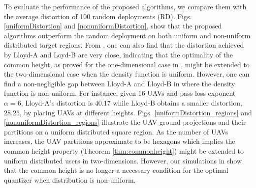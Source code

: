 \documentclass[smallabstract,smallcaptions]{dccpaper}
\begin{document}
To evaluate the performance of the proposed algorithms, we compare them with the average distortion of 100 random
deployments (RD).  Figs. \ref{uniformDistortion} and \ref{nonuniformDistortion}, show that the proposed algorithms
outperform the random deployment on both uniform and non-uniform distributed target regions.  From
, one can also find that the distortion achieved by Lloyd-A and Loyd-B are very close,
indicating that the optimality of the common height, as proved for the one-dimensional case in ,
might be extended to the two-dimensional case when the density function is uniform.  However, one can find a non-negligible
gap between Lloyd-A and Lloyd-B in  where the density function is non-uniform. For
instance, given $16$ UAVs and pass loss exponent $\alpha=6$, Lloyd-A's distortion is $40.17$ while Lloyd-B obtains a smaller
distortion, $28.25$, by placing UAVs at different heights.  
%
Figs. \ref{uniformDistortion_regions} and
\ref{nonuniformDistortion_regions} illustrate the UAV ground projections and their partitions on a uniform distributed
square region. As the number of UAVs increases, the UAV partitions approximate to be hexagons which implies the common height
property (Theorem \ref{thm:commonheight}) might be extended to uniform distributed users in two-dimensions.  However, our
simulations in \cite{GWJ18b} show that the common height is no longer a necessary condition for the optimal quantizer
when distribution is non-uniform.
%
\end{document}
